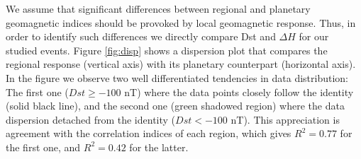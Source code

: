\documentclass[a4paper,fleqn]{cas-dc}
\begin{document}
We assume that significant differences between regional and planetary geomagnetic indices should be provoked by local geomagnetic response. Thus, in order to identify such
differences we directly compare Dst and $\Delta H$ for our studied events. Figure \ref{fig:disp} shows a dispersion plot that compares the regional response (vertical axis) with its planetary counterpart (horizontal axis). In the figure we observe two well differentiated tendencies in data distribution: The first one ($Dst \geq -100$ nT) where the data points closely follow the identity (solid black line), and the second one (green shadowed region) where the data dispersion detached from the identity ($Dst < -100$ nT). This appreciation is agreement with the correlation indices of each region, which gives $R^2 = 0.77$ for the first one, and $R^2 = 0.42$ for the latter.




\end{document}
